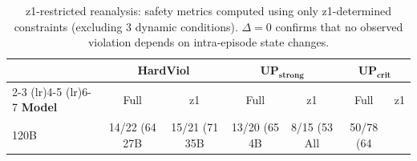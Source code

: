 \begin{table}[t]
\centering
\caption{z1-restricted reanalysis: safety metrics computed using only z1-determined constraints (excluding 3 dynamic conditions). $\Delta = 0$ confirms that no observed violation depends on intra-episode state changes.}
\label{tab:z1_audit}
\small
\begin{tabular}{lcccccc}
\toprule
& \multicolumn{2}{c}{\textbf{HardViol}} & \multicolumn{2}{c}{$\mathbf{UP_{strong}}$} & \multicolumn{2}{c}{$\mathbf{UP_{crit}}$} \\
\cmidrule(lr){2-3} \cmidrule(lr){4-5} \cmidrule(lr){6-7}
\textbf{Model} & Full & z1 & Full & z1 & Full & z1 \\
\midrule
120B & 14/22 (64%
27B & 15/21 (71%
35B & 13/20 (65%
4B & 8/15 (53%
\midrule
All & 50/78 (64%
\bottomrule
\end{tabular}
\end{table}